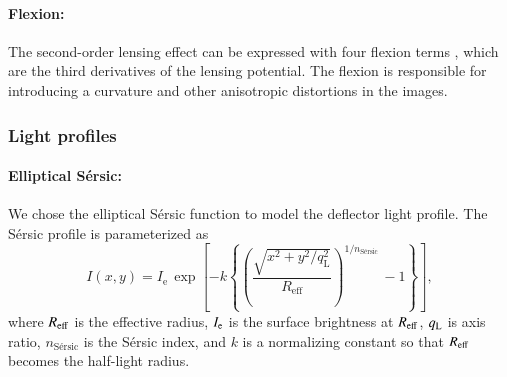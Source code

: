 \documentclass{aa}
\begin{document}


\paragraph{\textbf{Flexion:}} The second-order lensing effect can be expressed with four flexion terms \citep{Schneider08}, which are the third derivatives of the lensing potential. The flexion is responsible for introducing a curvature and other anisotropic distortions
in the images.


\subsubsection{Light profiles} \label{sec:light_profile}
\paragraph{\textbf{Elliptical S\'ersic:}}
We chose the elliptical S\'ersic function \citep{Sersic68} to model the deflector light profile. The S\'ersic profile is parameterized as
%
\begin{equation}
I\left(x, y\right)=I_{\mathrm{e}}\, \exp \left[-k\left\{\left(\frac{\sqrt{x^2+y^2 / q_{\mathrm{L}}^2}}{R_{\mathrm{eff}}}\right)^{1 / n_{\text {S\'ersic }}}-1\right\}\right]
,
\end{equation}
%
where $R_{\rm eff}$ is the effective radius, $I_{\rm e}$ is the surface brightness at $R_{\rm eff}$, $q_{\rm L}$ is axis ratio, $n_{\text{S\'ersic}}$ is the S\'ersic index, and $k$ is a normalizing constant so that $R_{\rm eff}$ becomes the half-light radius.
\end{document}

